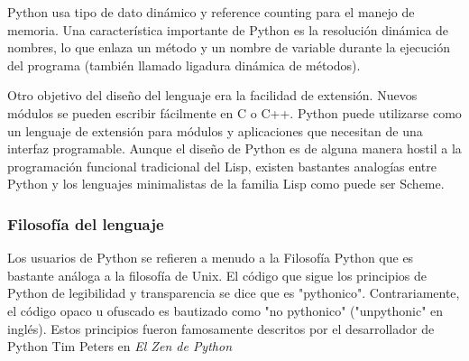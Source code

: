 \documentclass[a4paper]{report}
\begin{document}
Python usa tipo de dato dinámico y reference counting para el manejo de
memoria. 
Una característica importante de Python es la resolución dinámica de nombres, 
lo que enlaza un método y un nombre de variable durante la ejecución del
programa 
(también llamado ligadura dinámica de métodos).

Otro objetivo del diseño del lenguaje era la facilidad de extensión. 
Nuevos módulos se pueden escribir fácilmente en C o C++. 
Python puede utilizarse como un lenguaje de extensión para módulos y 
aplicaciones que necesitan de una interfaz programable. Aunque el diseño de
Python es 
de alguna manera hostil a la programación funcional tradicional del Lisp,
existen bastantes analogías 
entre Python y los lenguajes minimalistas de la familia Lisp como puede ser
Scheme.

\subsubsection*{Filosofía del lenguaje}

Los usuarios de Python se refieren a menudo a la Filosofía Python que es
bastante análoga a la filosofía de Unix. El código que sigue los principios de
Python de legibilidad y transparencia se dice que es "pythonico".
Contrariamente, el código opaco u ofuscado es bautizado como "no pythonico"
("unpythonic" en inglés). Estos principios fueron famosamente descritos por el
desarrollador de Python Tim Peters en \emph{El Zen de Python}
\end{document}
